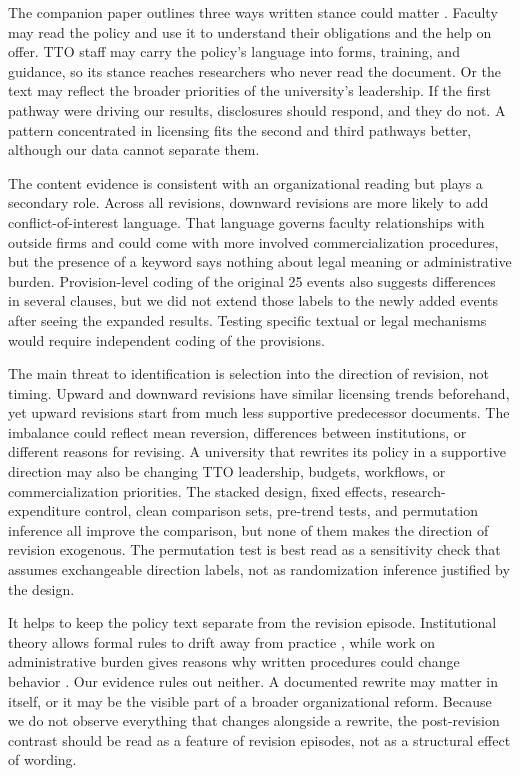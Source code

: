 The companion paper outlines three ways written stance could matter \citep{SharmaPCSI2026}. Faculty may read the policy and use it to understand their obligations and the help on offer. TTO staff may carry the policy's language into forms, training, and guidance, so its stance reaches researchers who never read the document. Or the text may reflect the broader priorities of the university's leadership. If the first pathway were driving our results, disclosures should respond, and they do not. A pattern concentrated in licensing fits the second and third pathways better, although our data cannot separate them.

The content evidence is consistent with an organizational reading but plays a secondary role. Across all revisions, downward revisions are more likely to add conflict-of-interest language. That language governs faculty relationships with outside firms and could come with more involved commercialization procedures, but the presence of a keyword says nothing about legal meaning or administrative burden. Provision-level coding of the original 25 events also suggests differences in several clauses, but we did not extend those labels to the newly added events after seeing the expanded results. Testing specific textual or legal mechanisms would require independent coding of the provisions.

The main threat to identification is selection into the direction of revision, not timing. Upward and downward revisions have similar licensing trends beforehand, yet upward revisions start from much less supportive predecessor documents. The imbalance could reflect mean reversion, differences between institutions, or different reasons for revising. A university that rewrites its policy in a supportive direction may also be changing TTO leadership, budgets, workflows, or commercialization priorities. The stacked design, fixed effects, research-expenditure control, clean comparison sets, pre-trend tests, and permutation inference all improve the comparison, but none of them makes the direction of revision exogenous. The permutation test is best read as a sensitivity check that assumes exchangeable direction labels, not as randomization inference justified by the design.

It helps to keep the policy text separate from the revision episode. Institutional theory allows formal rules to drift away from practice \citep{MeyerRowan1977}, while work on administrative burden gives reasons why written procedures could change behavior \citep{MoynihanHerdHarvey2015,HerdMoynihan2018}. Our evidence rules out neither. A documented rewrite may matter in itself, or it may be the visible part of a broader organizational reform. Because we do not observe everything that changes alongside a rewrite, the post-revision contrast should be read as a feature of revision episodes, not as a structural effect of wording.

